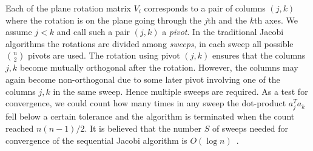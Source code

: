 \documentclass[10pt, conference, compsocconf]{IEEEtran}
\begin{document}

Each of the plane rotation matrix $V_i$ corresponds to a pair of columns $(j,k)$ where the rotation is on the plane going through the $j$th and the $k$th axes. We assume $j<k$ and call such a pair $(j,k)$ a \emph{pivot}.  In the traditional Jacobi algorithms the rotations are divided among \emph{sweeps}, in each sweep all possible ${n \choose 2}$ pivots are used. The rotation using pivot $(j,k)$ ensures that the columns $j,k$ become mutually orthogonal after the rotation. However, the columns may again become non-orthogonal due to some later pivot involving one of the columns $j,k$ in the same sweep. Hence multiple sweeps are required. As a test for convergence, we could count how many times in any sweep the dot-product $a_j^{T}a_k$ fell below a certain tolerance and the algorithm is terminated when the count reached $n(n-1)/2$. It is believed that the number $S$ of sweeps needed for convergence of the sequential Jacobi algorithm is $O(\log n)$~\cite{golub2012matrix}.  
\end{document}
